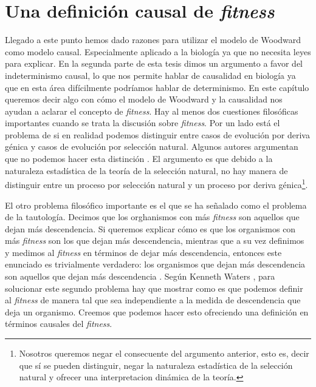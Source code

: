 
\chapter{Una definición causal de \emph{fitness}}


\noindent Llegado a este punto hemos dado razones para utilizar el modelo de Woodward como modelo causal. Especialmente aplicado a la biología ya que no necesita leyes para explicar. En la segunda parte de esta tesis dimos un argumento a favor del indeterminismo causal, lo que nos permite hablar de causalidad en biología ya que en esta área difícilmente podríamos hablar de determinismo. En este capítulo queremos decir algo con cómo el modelo de Woodward y la causalidad nos ayudan a aclarar el concepto de \emph{fitness}. Hay al menos dos cuestiones filosóficas importantes cuando se trata la discusión sobre \emph{fitness}. Por un lado está el problema de si en realidad podemos distinguir entre casos de evolución por deriva génica y casos de evolución por selección natural. Algunos autores argumentan que no podemos hacer esta distinción \cite{Walsh2002}. El argumento es que debido a la naturaleza estadística de la teoría de la selección natural, no hay manera de distinguir entre un proceso por selección natural y un proceso por deriva génica\footnote{ Nosotros queremos negar el consecuente del argumento anterior, esto es, decir que sí se pueden distinguir, negar la naturaleza estadística de la selección natural y ofrecer una interpretacion dinámica de la teoría. }.

El otro problema filosófico importante es el que se ha señalado como el problema de la tautología. Decimos que los orghanismos con más \emph{fitness} son aquellos que dejan más descendencia. Si queremos explicar cómo es que los organismos con más \emph{fitness} son los que dejan más descendencia, mientras que a su vez definimos y medimos al \emph{fitness} en términos de dejar más descendencia, entonces este enunciado es trivialmente verdadero: los organismos que dejan más descendencia son aquellos que dejan más descendencia \cite{Bouchard2004, Paul1992}. Según Kenneth Waters \cite{Waters1986}, para solucionar este segundo problema hay que mostrar como es que podemos definir al \emph{fitness} de manera tal que sea independiente a la medida de descendencia que deja un organismo. Creemos que podemos hacer esto ofreciendo una definición en términos causales del \emph{fitness}.


